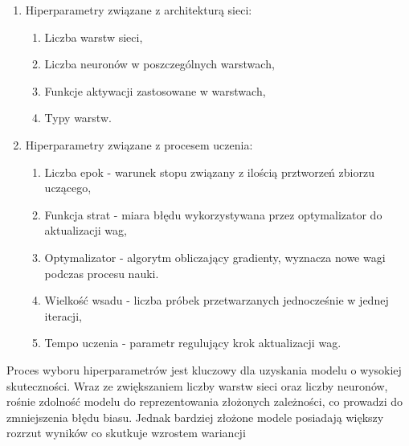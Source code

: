 \documentclass[a4paper,twoside,12pt]{book}
\begin{document}
\begin{enumerate}
	\item Hiperparametry związane z architekturą sieci:
	      \begin{enumerate}
		      \item Liczba warstw sieci,
		      \item Liczba neuronów w poszczególnych warstwach,
		      \item Funkcje aktywacji zastosowane w warstwach,
		      \item Typy warstw.
	      \end{enumerate}
	\item Hiperparametry związane z procesem uczenia:
	      \begin{enumerate}
		      \item Liczba epok - warunek stopu związany z ilością prztworzeń zbiorzu uczącego,
		      \item Funkcja strat - miara błędu wykorzystywana przez optymalizator do aktualizacji wag,
		      \item Optymalizator -  algorytm obliczający gradienty, wyznacza nowe wagi podczas procesu nauki.
		      \item Wielkość wsadu - liczba próbek przetwarzanych jednocześnie w jednej iteracji,
		      \item Tempo uczenia - parametr regulujący krok aktualizacji wag.
	      \end{enumerate}
\end{enumerate}

Proces wyboru hiperparametrów jest kluczowy dla uzyskania modelu o wysokiej skuteczności. Wraz ze zwiększaniem liczby warstw sieci oraz liczby neuronów, rośnie zdolność modelu do reprezentowania złożonych zależności, co prowadzi do zmniejszenia błędu biasu. Jednak bardziej złożone modele posiadają większy rozrzut wyników co skutkuje wzrostem wariancji
\end{document}

